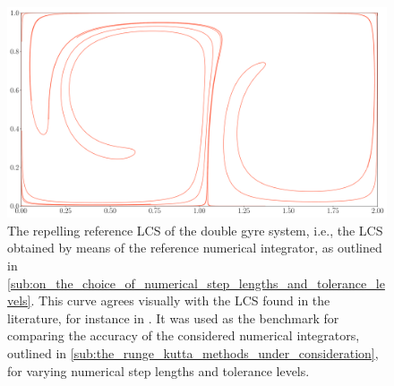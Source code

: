 \begin{figure}[htpb]
    \centering
    \includegraphics[width=0.9\linewidth]{figures/reference_lcs.pdf}
    \caption[The repelling reference LCS of the double gyre system]{The
    repelling reference LCS of the double gyre system, i.e., the LCS obtained
    by means of the reference numerical integrator, as outlined in
    \cref{sub:on_the_choice_of_numerical_step_lengths_and_tolerance_levels}.
    This curve agrees visually with the LCS found in the literature, for
    instance in \textcite{farazmand2012computing}. It was used as the benchmark
    for comparing the accuracy of the considered numerical integrators,
    outlined in \cref{sub:the_runge_kutta_methods_under_consideration}, for
    varying numerical step lengths and tolerance levels.}
    \label{fig:referencelcs}
\end{figure}

